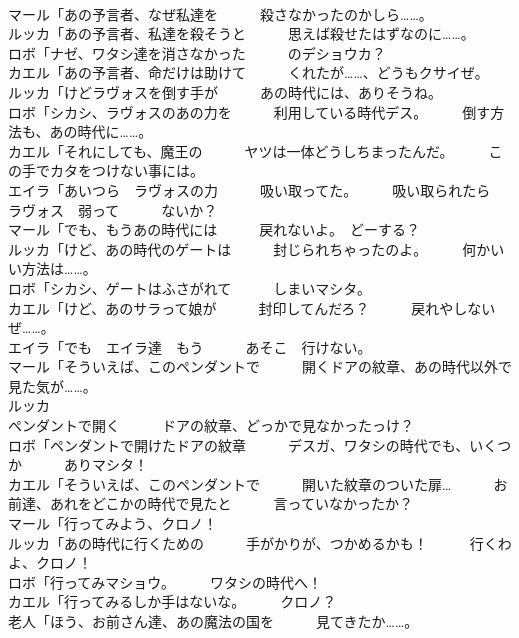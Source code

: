 \documentclass[8pt]{extreport}
\begin{document}
\begin{CJK}{UTF8}{min}
\\	マール「あの予言者、なぜ私達を　　　殺さなかったのかしら……。	
\\	ルッカ「あの予言者、私達を殺そうと　　　思えば殺せたはずなのに……。	
\\	ロボ「ナゼ、ワタシ達を消さなかった　　　のデショウカ？	
\\	カエル「あの予言者、命だけは助けて　　　くれたが……、どうもクサイぜ。	
\\	ルッカ「けどラヴォスを倒す手が　　　あの時代には、ありそうね。	
\\	ロボ「シカシ、ラヴォスのあの力を　　　利用している時代デス。　　　倒す方法も、あの時代に……。	
\\	カエル「それにしても、魔王の　　　ヤツは一体どうしちまったんだ。　　　この手でカタをつけない事には。	
\\	エイラ「あいつら　ラヴォスの力　　　吸い取ってた。　　　吸い取られたら　ラヴォス　弱って　　　ないか？	
\\	マール「でも、もうあの時代には　　　戻れないよ。　どーする？	
\\	ルッカ「けど、あの時代のゲートは　　　封じられちゃったのよ。　　　何かいい方法は……。	
\\	ロボ「シカシ、ゲートはふさがれて　　　しまいマシタ。	
\\	カエル「けど、あのサラって娘が　　　封印してんだろ？　　　戻れやしないぜ……。	
\\	エイラ「でも　エイラ達　もう　　　あそこ　行けない。	
\\	マール「そういえば、このペンダントで　　　開くドアの紋章、あの時代以外で　　　見た気が……。	
\\	ルッカ
\\	ペンダントで開く　　　ドアの紋章、どっかで見なかったっけ？	
\\	ロボ「ペンダントで開けたドアの紋章　　　デスガ、ワタシの時代でも、いくつか　　　ありマシタ！	
\\	カエル「そういえば、このペンダントで　　　開いた紋章のついた扉…　　　お前達、あれをどこかの時代で見たと　　　言っていなかったか？	
\\	マール「行ってみよう、クロノ！	
\\	ルッカ「あの時代に行くための　　　手がかりが、つかめるかも！　　　行くわよ、クロノ！	
\\	ロボ「行ってみマショウ。　　　ワタシの時代へ！	
\\	カエル「行ってみるしか手はないな。　　　クロノ？	
\\	老人「ほう、お前さん達、あの魔法の国を　　　見てきたか……。	

\end{CJK}
\end{document}
